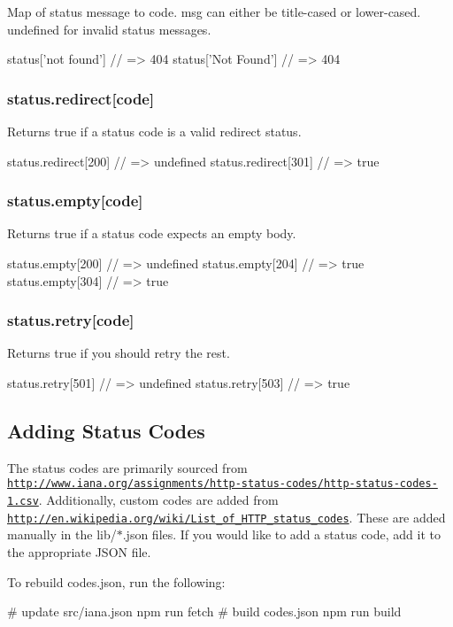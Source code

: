 Map of {\ttfamily status message} to {\ttfamily code}. {\ttfamily msg} can either be title-\/cased or lower-\/cased. {\ttfamily undefined} for invalid {\ttfamily status message}s.


\begin{DoxyCode}
status['not found'] // => 404
status['Not Found'] // => 404
\end{DoxyCode}


\subsubsection*{status.\+redirect\mbox{[}code\mbox{]}}

Returns {\ttfamily true} if a status code is a valid redirect status.


\begin{DoxyCode}
status.redirect[200] // => undefined
status.redirect[301] // => true
\end{DoxyCode}


\subsubsection*{status.\+empty\mbox{[}code\mbox{]}}

Returns {\ttfamily true} if a status code expects an empty body.


\begin{DoxyCode}
status.empty[200] // => undefined
status.empty[204] // => true
status.empty[304] // => true
\end{DoxyCode}


\subsubsection*{status.\+retry\mbox{[}code\mbox{]}}

Returns {\ttfamily true} if you should retry the rest.


\begin{DoxyCode}
status.retry[501] // => undefined
status.retry[503] // => true
\end{DoxyCode}


\subsection*{Adding Status Codes}

The status codes are primarily sourced from \href{http://www.iana.org/assignments/http-status-codes/http-status-codes-1.csv}{\tt http\+://www.\+iana.\+org/assignments/http-\/status-\/codes/http-\/status-\/codes-\/1.\+csv}. Additionally, custom codes are added from \href{http://en.wikipedia.org/wiki/List_of_HTTP_status_codes}{\tt http\+://en.\+wikipedia.\+org/wiki/\+List\+\_\+of\+\_\+\+H\+T\+T\+P\+\_\+status\+\_\+codes}. These are added manually in the {\ttfamily lib/$\ast$.json} files. If you would like to add a status code, add it to the appropriate J\+S\+ON file.

To rebuild {\ttfamily codes.\+json}, run the following\+:


\begin{DoxyCode}
# update src/iana.json
npm run fetch
# build codes.json
npm run build
\end{DoxyCode}
 